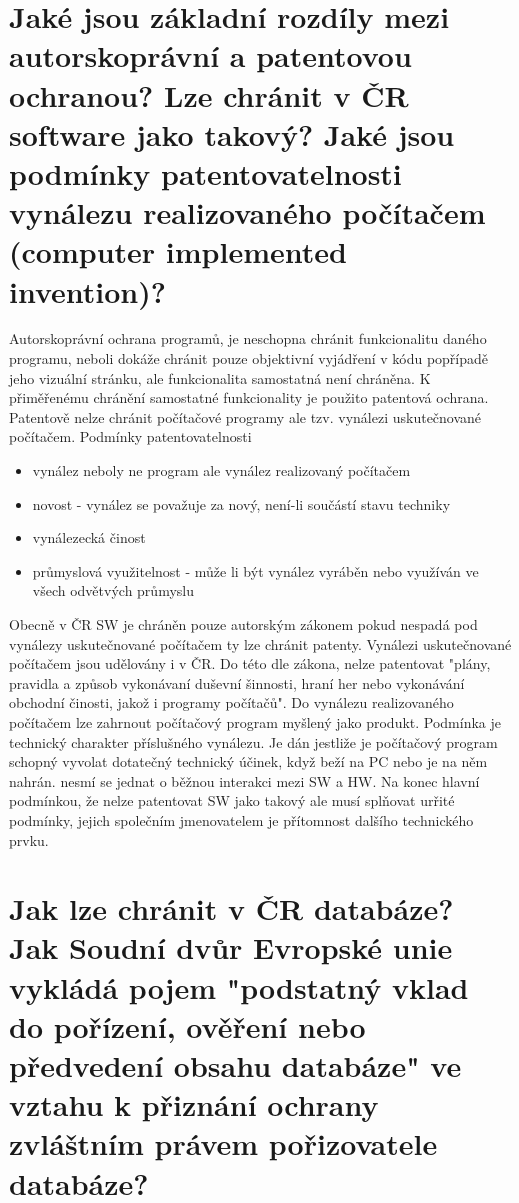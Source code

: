 \documentclass[12pt,a4paper,czech]{article}
\newcommand{\nadpis}[1]{{\section{#1}}}
\begin{document}
\vspace{0.5cm} 
\nadpis{Jaké jsou základní rozdíly mezi autorskoprávní a patentovou ochranou? Lze chránit v ČR software jako takový? Jaké jsou podmínky patentovatelnosti vynálezu realizovaného počítačem (computer implemented invention)?}

Autorskoprávní ochrana programů, je neschopna chránit funkcionalitu daného programu, neboli dokáže chránit pouze objektivní vyjádření v kódu popřípadě jeho vizuální stránku, ale funkcionalita samostatná není chráněna. K přiměřenému chránění samostatné funkcionality je použito patentová ochrana. Patentově nelze chránit počítačové programy ale tzv. vynálezi uskutečnované počítačem. 
\newline
\newline
Podmínky patentovatelnosti
\begin{itemize}
    \setlength\itemsep{0em}
    \item  vynález neboly ne program ale vynález realizovaný počítačem
    \item novost - vynález se považuje za nový, není-li součástí stavu techniky
    \item vynálezecká činost
    \item průmyslová využitelnost - může li být vynález vyráběn nebo využíván ve všech odvětvých průmyslu
\end{itemize}
Obecně v ČR SW je chráněn pouze autorským zákonem pokud nespadá pod vynálezy uskutečnované počítačem ty lze chránit patenty.  
Vynálezi uskutečnované počítačem jsou udělovány i v ČR. Do této dle zákona, nelze patentovat "plány, pravidla a způsob vykonávaní duševní šinnosti, hraní her nebo vykonávání obchodní činosti, jakož i programy počítačů".
Do vynálezu realizovaného počítačem lze zahrnout počítačový program myšlený jako produkt. Podmínka je technický charakter příslušného vynálezu. Je dán jestliže je počítačový program schopný vyvolat dotatečný technický účinek, když beží na PC nebo je na něm nahrán. nesmí se jednat o běžnou interakci mezi SW a HW.  
Na konec hlavní podmínkou, že nelze patentovat SW jako takový ale musí splňovat urřité podmínky, jejich společním jmenovatelem je přítomnost dalšího technického prvku. 


\vspace{0.5cm} 
\nadpis{Jak lze chránit v ČR databáze? Jak Soudní dvůr Evropské unie vykládá pojem "podstatný vklad do pořízení, ověření nebo předvedení obsahu databáze" ve vztahu k přiznání ochrany zvláštním právem pořizovatele databáze?}
\end{document}
